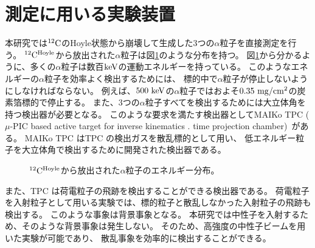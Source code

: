 \section{測定に用いる実験装置}
本研究では${}^{12}{\rm C}$のHoyle状態から崩壊して生成した3つの$\alpha$粒子を直接測定を行う。
${}^{12}{\rm C}^{\rm Hoyle}$から放出された$\alpha$粒子は図\ref{fig::alpha_E_dist}のような分布を持つ。
図\ref{fig::alpha_E_dist}から分かるように、多くの$\alpha$粒子は数百${\rm keV}$の運動エネルギーを持っている。
このようなエネルギーの$\alpha$粒子を効率よく検出するためには、
標的中で$\alpha$粒子が停止しないようにしなければならない。
例えば、$500~{\rm keV}$の$\alpha$粒子ではおよそ$0.35~{\rm mg/cm^2}$の炭素箔標的で停止する。
また、3つの$\alpha$粒子すべてを検出するためには大立体角を持つ検出器が必要となる。
このような要求を満たす検出器としてMAIKo TPC ($\mu$-PIC based active target for inverse kinematics .
time projection chamber)~\cite{maiko, mupic}がある。
MAIKo TPC はTPC の検出ガスを散乱標的として用い、
低エネルギー粒子を大立体角で検出するために開発された検出器である。
\begin{figure}
  \centering
  \caption[${}^{12}{\rm C}^{\rm Hoyle}$から放出された$\alpha$粒子のエネルギー分布。]
          {${}^{12}{\rm C}^{\rm Hoyle}$から放出された$\alpha$粒子のエネルギー分布。}
  \label{fig::alpha_E_dist}
\end{figure}

また、TPC は荷電粒子の飛跡を検出することができる検出器である。
荷電粒子を入射粒子として用いる実験では、標的粒子と散乱しなかった入射粒子の飛跡も検出する。
このような事象は背景事象となる。
本研究では中性子を入射するため、そのような背景事象は発生しない。
そのため、高強度の中性子ビームを用いた実験が可能であり、
散乱事象を効率的に検出することができる。
